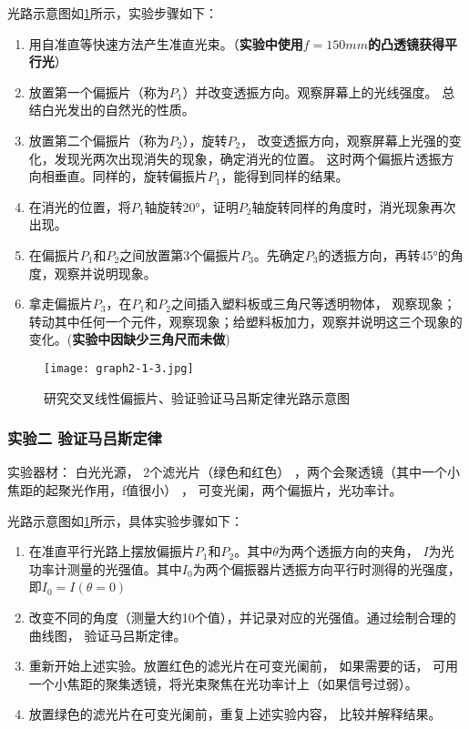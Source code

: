 \documentclass[dvipsnames, svgnames,a4paper,11pt]{article}
\begin{document}
	光路示意图如\cref{fig:graph2-1-3}所示，实验步骤如下：
	\begin{enumerate}
		\item 用自准直等快速方法产生准直光束。（\textbf{实验中使用$f=150mm$的凸透镜获得平行光}）
		\item 放置第一个偏振片（称为$P_1$）并改变透振方向。观察屏幕上的光线强度。 总结白光发出的自然光的性质。

		\item 放置第二个偏振片（称为$P_2$），旋转$P_2$， 改变透振方向，观察屏幕上光强的变化，发现光两次出现消失的现象，确定消光的位置。 这时两个偏振片透振方向相垂直。同样的，旋转偏振片$P_1$，能得到同样的结果。
		\item 在消光的位置，将$P_1$轴旋转20°，证明$P_2$轴旋转同样的角度时，消光现象再次出现。
		\item 在偏振片$P_1$和$P_2$之间放置第3个偏振片$P_3$。先确定$P_3$的透振方向，再转45°的角度，观察并说明现象。
		\item 拿走偏振片$P_3$，在$P_1$和$P_2$之间插入塑料板或三角尺等透明物体， 观察现象；转动其中任何一个元件，观察现象；给塑料板加力，观察并说明这三个现象的变化。(\textbf{实验中因缺少三角尺而未做})

	\end{enumerate}

	\begin{figure}[htbp]
		\centering
		\texttt{[image: graph2-1-3.jpg]}
		\caption{研究交叉线性偏振片、验证验证马吕斯定律光路示意图}
		\label{fig:graph2-1-3}
	\end{figure}


	\subsubsection{实验二 \quad 验证马吕斯定律}

	实验器材： 白光光源， 2个滤光片（绿色和红色） ，两个会聚透镜（其中一个小焦距的起聚光作用，f值很小） ， 可变光阑，两个偏振片，光功率计。

	光路示意图如\cref{fig:graph2-1-3}所示，具体实验步骤如下：
	\begin{enumerate}
		\item 在准直平行光路上摆放偏振片$P_1$和$P_2$。其中$\theta$为两个透振方向的夹角， $I$为光功率计测量的光强值。其中$I_0$为两个偏振器片透振方向平行时测得的光强度，即$I_0=I(\theta=0)$
		\item 改变不同的角度（测量大约10个值），并记录对应的光强值。通过绘制合理的曲线图， 验证马吕斯定律。
		\item 重新开始上述实验。放置红色的滤光片在可变光阑前， 如果需要的话， 可用一个小焦距的聚集透镜，将光束聚焦在光功率计上（如果信号过弱）。
		\item 放置绿色的滤光片在可变光阑前，重复上述实验内容， 比较并解释结果。
	\end{enumerate}
\end{document}
